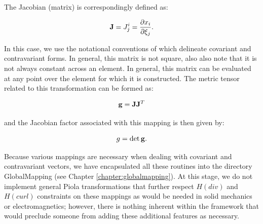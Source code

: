 The Jacobian (matrix) is correspondingly defined as:

\begin{equation} \label{eqn:jacobianmat}
{\bf J} = J^i_j = \frac{\partial x_i}{\partial \xi_j}.
\end{equation}

In this case, we use the notational conventions of \cite{Ar89} which delineate covariant and contravariant forms. In general, this matrix is not square, 
also also note that it is not always constant across an element.  In general, this matrix can be evaluated at any point over the element for which it is constructed.
The metric tensor related to this transformation can be formed as:

$$
{\bf g} = {\bf J}{\bf J}^T
$$

\noindent and the Jacobian factor associated with this mapping is then given by:

$$
g = \det{\bf g}.
$$

Because various mappings are necessary when dealing with covariant and contravariant vectors, we have encapsulated all these routines 
into the directory GlobalMapping (see Chapter \ref{chapter:globalmapping}).  At this stage, we do not implement general Piola transformations \cite{McRaeBMHC} that further respect $H(div)$ and $H(curl)$ constraints on these mappings
as would be needed in solid mechanics or electromagnetics; however, there is nothing inherent within the {\nek} framework that would preclude someone from
adding these additional features as necessary.


